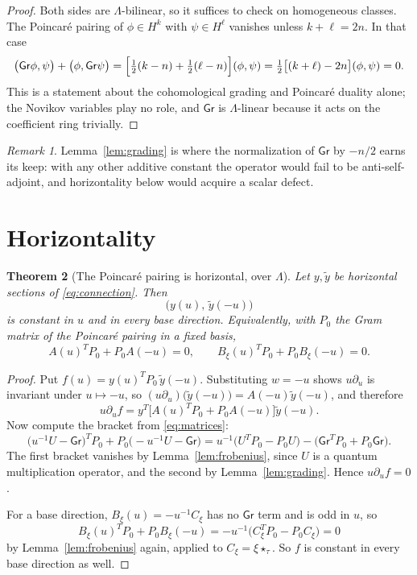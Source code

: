 \documentclass[11pt]{article}
\newtheorem{theorem}{Theorem}[section]
\theoremstyle{definition}
\theoremstyle{remark}
\newtheorem{remark}[theorem]{Remark}
\newcommand{\Gr}{\mathsf{Gr}}
\newcommand{\Nov}{\Lambda}
\begin{document}
\begin{proof}
Both sides are $\Nov$-bilinear, so it suffices to check on homogeneous classes.
The Poincar\'e pairing of $\phi\in H^k$ with $\psi\in H^\ell$ vanishes unless
$k+\ell=2n$. In that case
\[
  \bigl(\Gr\phi,\psi\bigr)+\bigl(\phi,\Gr\psi\bigr)
  =\Bigl[\tfrac12(k-n)+\tfrac12(\ell-n)\Bigr](\phi,\psi)
  =\tfrac12\bigl[(k+\ell)-2n\bigr](\phi,\psi)=0 .
\]
This is a statement about the cohomological grading and Poincar\'e duality
alone; the Novikov variables play no role, and $\Gr$ is $\Nov$-linear because it
acts on the coefficient ring trivially.
\end{proof}

\begin{remark}
Lemma~\ref{lem:grading} is where the normalization of $\Gr$ by $-n/2$ earns its
keep: with any other additive constant the operator would fail to be
anti-self-adjoint, and horizontality below would acquire a scalar defect.
\end{remark}

\section{Horizontality}

\begin{theorem}[The Poincar\'e pairing is horizontal, over $\Nov$]
\label{thm:horizontal}
Let $y,\tilde y$ be horizontal sections of \eqref{eq:connection}. Then
\[
  \bigl(y(u),\,\tilde y(-u)\bigr)
\]
is constant in $u$ and in every base direction. Equivalently, with $P_0$ the
Gram matrix of the Poincar\'e pairing in a fixed basis,
\[
  A(u)^TP_0+P_0A(-u)=0,
  \qquad
  B_\xi(u)^TP_0+P_0B_\xi(-u)=0 .
  \tag{3}
  \label{eq:horizontality}
\]
\end{theorem}

\begin{proof}
Put $f(u)=y(u)^TP_0\,\tilde y(-u)$. Substituting $w=-u$ shows $u\partial_u$ is
invariant under $u\mapsto-u$, so $(u\partial_u)\bigl(\tilde y(-u)\bigr)
=A(-u)\tilde y(-u)$, and therefore
\[
  u\partial_uf
  =y^T\bigl[A(u)^TP_0+P_0A(-u)\bigr]\tilde y(-u).
\]
Now compute the bracket from \eqref{eq:matrices}:
\[
  \bigl(u^{-1}U-\Gr\bigr)^TP_0+P_0\bigl(-u^{-1}U-\Gr\bigr)
  =u^{-1}\bigl(U^TP_0-P_0U\bigr)-\bigl(\Gr^TP_0+P_0\Gr\bigr).
\]
The first bracket vanishes by Lemma~\ref{lem:frobenius}, since $U$ is a quantum
multiplication operator, and the second by Lemma~\ref{lem:grading}. Hence
$u\partial_uf=0$.

For a base direction, $B_\xi(u)=-u^{-1}C_\xi$ has no $\Gr$ term and is odd in
$u$, so
\[
  B_\xi(u)^TP_0+P_0B_\xi(-u)
  =-u^{-1}\bigl(C_\xi^TP_0-P_0C_\xi\bigr)=0
\]
by Lemma~\ref{lem:frobenius} again, applied to $C_\xi=\xi\star_\tau$. So $f$ is
constant in every base direction as well.
\end{proof}
\end{document}
